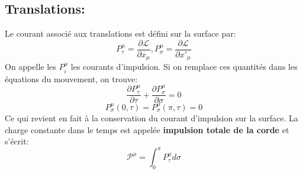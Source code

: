 \documentclass[a4paper,12pt]{article}
\def\CL{\mathcal{L}}
\begin{document}
\subsection{Translations:}

Le courant associé aux translations est défini sur la surface par:  
$$P^{\mu}_{\tau}=\frac{\partial \CL}{\partial \dot{x_{\mu}}},			 P^{\mu}_{\sigma}=\frac{\partial \CL}{\partial x'_{\mu}}$$
On appelle les $P^\mu_i$ les courants d'impulsion.
Si on remplace ces quantités dans les équations du mouvement, on trouve:
$$\frac{\partial P^{\mu}_{\tau}}{\partial \tau}+\frac{\partial P^{\mu}_{\sigma}}{\partial \sigma}=0$$
 $$P^{\mu}_{\sigma}(0,\tau)=P^{\mu}_{\sigma}(\pi,\tau)=0$$
Ce qui revient en fait à la conservation du courant d'impulsion sur la surface.
La charge constante dans le temps est appelée \textbf{impulsion totale de la corde} et s'écrit:
$$\mathcal{P^{\mu}}=\int_{0}^{\pi}P^{\mu}_{\tau}d\sigma$$
\end{document}
